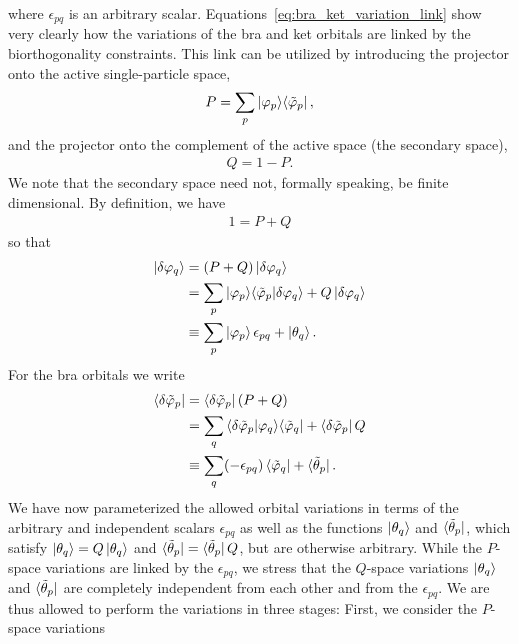 \documentclass[aip,jcp,preprint,superscriptaddress,nofootinbib]{revtex4-1}
\begin{document}
where $\epsilon_{pq}$ is an arbitrary scalar.
Equations~\eqref{eq:bra_ket_variation_link} show very clearly how the
variations of the bra and ket orbitals are linked by the biorthogonality
constraints.
This link can be utilized by
introducing the projector onto the active single-particle space,
\begin{align} \label{eq:P_proj_def}
    P = \sum_{p}  \ket{\varphi_{p}} \! \bra{\tilde{\varphi}_{p}},
\end{align}
and the projector onto the complement of the active space
(the secondary space),
\begin{align} \label{eq:Q_proj_def}
    Q = 1 - P.
\end{align}
We note that the secondary space need not, formally speaking, be finite dimensional.
By definition, we have
\begin{align}
    1 = P + Q
\end{align}
so that
\begin{align} \label{eq:general_phiket_variation}
    \ket{\delta\varphi_{q}} 
    &= (P + Q) \ket{\delta\varphi_{q}} \nonumber\\
    &= \sum_{p}  \ket{\varphi_{p}} \! \braket{{\tilde{\varphi}_{p}} | \delta\varphi_{q}} + Q \ket{\delta\varphi_{q}} \nonumber\\
    &\equiv \sum_{p} \ket{\varphi_{p}} \epsilon_{pq} + \ket{\theta_q}.
\end{align}
For the bra orbitals we write
\begin{align} \label{eq:general_phibra_variation}
    \bra{\delta\tilde{\varphi}_{p}} 
    &= \bra{\delta\tilde{\varphi}_{p}} (P + Q) \nonumber\\
    &= \sum_{q} \braket{\delta\tilde{\varphi}_{p} | \varphi_{q}} \! \bra{\tilde{\varphi}_{q}}
    + \bra{\delta\tilde{\varphi}_{p}} Q  \nonumber\\
    &\equiv
    \sum_{q} (-\epsilon_{pq}) \bra{\tilde{\varphi}_{q}} + \bra{\tilde{\theta}_p}.
\end{align}
We have now parameterized the allowed orbital
variations
in terms of the arbitrary and independent scalars $\epsilon_{pq}$ 
as well as the functions $\ket{\theta_q}$ and $\bra{\tilde{\theta}_p}$,
which satisfy
$\ket{\theta_q} = Q \ket{\theta_q} $ and
$\bra{\tilde{\theta}_p} = \bra{\tilde{\theta}_p} Q$, but are otherwise
arbitrary. While the
$P$-space variations are linked by
the $\epsilon_{pq}$, we stress that the $Q$-space variations $\ket{\theta_q}$ and $\bra{\tilde{\theta}_p}$
are completely independent from each other and from the $\epsilon_{pq}$. We are thus allowed
to perform the variations in three stages: First, we consider the $P$-space variations
\end{document}
